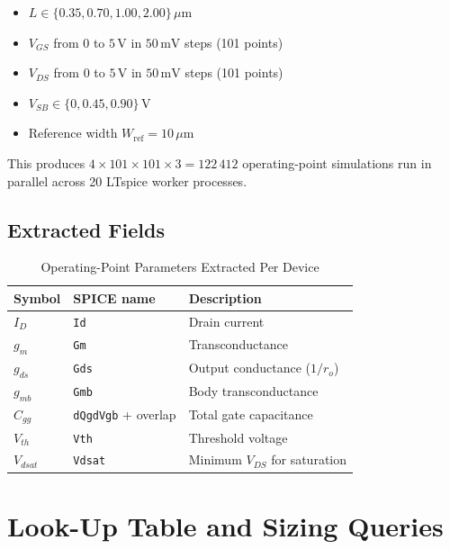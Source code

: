 \documentclass[conference]{IEEEtran}
\begin{document}
\begin{itemize}
  \item $L \in \{0.35, 0.70, 1.00, 2.00\}\,\mu\text{m}$
  \item $V_{GS}$ from $0$ to $5\,\text{V}$ in $50\,\text{mV}$ steps (101 points)
  \item $V_{DS}$ from $0$ to $5\,\text{V}$ in $50\,\text{mV}$ steps (101 points)
  \item $V_{SB} \in \{0, 0.45, 0.90\}\,\text{V}$
  \item Reference width $W_{\text{ref}} = 10\,\mu\text{m}$
\end{itemize}

This produces $4 \times 101 \times 101 \times 3 = 122\,412$ operating-point
simulations run in parallel across 20 LTspice worker processes.

\subsection{Extracted Fields}

\begin{table}[htbp]
\caption{Operating-Point Parameters Extracted Per Device}
\begin{center}
\begin{tabular}{lll}
\toprule
\textbf{Symbol} & \textbf{SPICE name} & \textbf{Description} \\
\midrule
$I_D$      & \texttt{Id}      & Drain current \\
$g_m$      & \texttt{Gm}      & Transconductance \\
$g_{ds}$   & \texttt{Gds}     & Output conductance ($1/r_o$) \\
$g_{mb}$   & \texttt{Gmb}     & Body transconductance \\
$C_{gg}$   & \texttt{dQgdVgb} + overlap & Total gate capacitance \\
$V_{th}$   & \texttt{Vth}     & Threshold voltage \\
$V_{dsat}$ & \texttt{Vdsat}   & Minimum $V_{DS}$ for saturation \\
\bottomrule
\end{tabular}
\label{tab:opfields}
\end{center}
\end{table}

\section{Look-Up Table and Sizing Queries}
\label{sec:lut}
\end{document}

